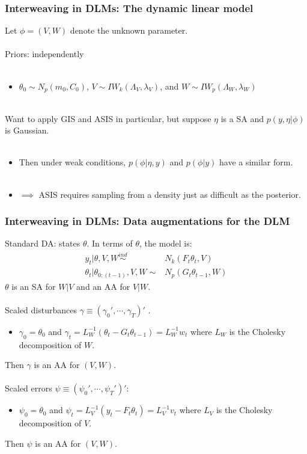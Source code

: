 \documentclass[xcolor=dvipsnames]{beamer}
\begin{document}
\begin{frame}
  \frametitle{Interweaving in DLMs: The dynamic linear model} 
Let $\phi=(V,W)$ denote the unknown parameter.\\~\\

Priors: independently \\~\\
\begin{itemize}
\item[]$\theta_0\sim N_p(m_0,C_0)$, $V\sim IW_k(\Lambda_V,\lambda_V)$, and $W\sim IW_p(\Lambda_W,\lambda_W)$\\~\\
\end{itemize}

\pause Want to apply GIS and ASIS in particular, but suppose $\eta$ is a SA and $p(y,\eta|\phi)$ is Gaussian.\\~
\begin{itemize}
\item[] Then under weak conditions, $p(\phi|\eta,y)$ and $p(\phi|y)$ have a similar form.\\~\\
\pause\item[] $\implies$ ASIS requires sampling from a density just as difficult as the posterior.
\end{itemize}

\end{frame}

\begin{frame}
\frametitle{Interweaving in DLMs: Data augmentations for the DLM}
Standard DA: states $\theta$. In terms of $\theta$, the model is:
\begin{align*}
y_t|\theta,V,W \stackrel{ind}{\sim} & N_k(F_t\theta_t,V)\\ 
\theta_t|\theta_{0:(t-1)},V,W \sim & N_p(G_t\theta_{t-1},W)
\end{align*} 
{\color{blue}$\theta$ is an SA for $W|V$ and an AA for $V|W$.}\\~\\

\pause Scaled disturbances $\gamma\equiv(\gamma_0',\cdots,\gamma_T)'$ \citep{fruhwirth2004efficient}.
\begin{itemize}
\item[]$\gamma_0=\theta_0$ and $\gamma_t=L_W^{-1}(\theta_t - G_t\theta_{t-1})=L_W^{-1}w_t$ where $L_W$ is the Cholesky decomposition of $W$.
\end{itemize}
\pause Then {\color{blue}$\gamma$ is an AA for $(V,W)$.}\\~\\


\pause Scaled errors $\psi\equiv(\psi_0',\cdots,\psi_T')'$:
\begin{itemize}
\item[]$\psi_0=\theta_0$ and $\psi_t=L_V^{-1}(y_t - F_t\theta_t)=L_V^{-1}v_t$ where $L_V$ is the Cholesky decomposition of $V$.
\end{itemize}
\pause Then {\color{blue}$\psi$ is an AA for $(V,W)$.}
\end{frame}
\end{document}
